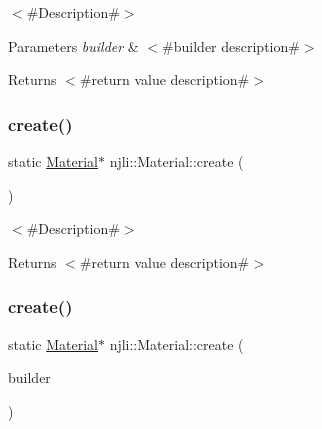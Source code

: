 $<$\#\+Description\#$>$


\begin{DoxyParams}{Parameters}
{\em builder} & $<$\#builder description\#$>$\\
\hline
\end{DoxyParams}
\begin{DoxyReturn}{Returns}
$<$\#return value description\#$>$ 
\end{DoxyReturn}
\mbox{\label{classnjli_1_1_material_a72bd6ccb8f216e2f5c4d054b297a55e6}} 
\subsubsection{\texorpdfstring{create()}{create()}\hspace{0.1cm}{\footnotesize\ttfamily [2/3]}}
{\footnotesize\ttfamily static \mbox{\hyperlink{classnjli_1_1_material}{Material}}$\ast$ njli\+::\+Material\+::create (\begin{DoxyParamCaption}{ }\end{DoxyParamCaption})\hspace{0.3cm}{\ttfamily [static]}}

$<$\#\+Description\#$>$

\begin{DoxyReturn}{Returns}
$<$\#return value description\#$>$ 
\end{DoxyReturn}
\mbox{\label{classnjli_1_1_material_a3e040d6afaa59825df4c3df3edcefdb3}} 
\subsubsection{\texorpdfstring{create()}{create()}\hspace{0.1cm}{\footnotesize\ttfamily [3/3]}}
{\footnotesize\ttfamily static \mbox{\hyperlink{classnjli_1_1_material}{Material}}$\ast$ njli\+::\+Material\+::create (\begin{DoxyParamCaption}\item[{const \mbox{\hyperlink{classnjli_1_1_material_builder}{Material\+Builder}} \&}]{builder }\end{DoxyParamCaption})\hspace{0.3cm}{\ttfamily [static]}}

